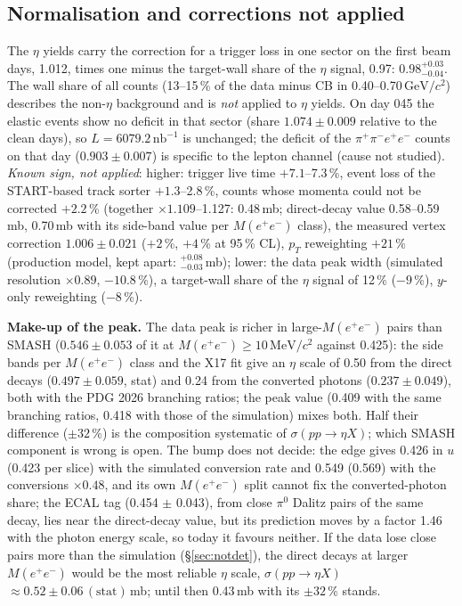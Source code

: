 \documentclass[11pt,a4paper]{article}
\newcommand{\piz}{\ensuremath{\pi^{0}}\xspace}
\newcommand{\ppee}{\ensuremath{\pi^{+}\pi^{-}e^{+}e^{-}}\xspace}
\newcommand{\Mee}{\ensuremath{M(e^{+}e^{-})}\xspace}
\newcommand{\nbinv}{\ensuremath{\mathrm{nb}^{-1}}\xspace}
\newcommand{\GeVcc}{\ensuremath{\mathrm{GeV}/c^{2}}\xspace}
\newcommand{\MeVcc}{\ensuremath{\mathrm{MeV}/c^{2}}\xspace}
\newcommand{\sigeta}{\ensuremath{\sigma(pp\to\eta X)}\xspace}
\begin{document}
\subsection*{Normalisation and corrections not applied}
The $\eta$ yields carry the correction for a trigger loss in one sector on the first beam days, 1.012, times one minus the target-wall share of the
$\eta$ signal, 0.97: $0.98^{+0.03}_{-0.04}$. The wall share of all counts (13--15\,\% of the data minus CB in 0.40--0.70\,\GeVcc) describes the
non-$\eta$ background and is \emph{not} applied to $\eta$ yields. On day 045 the elastic events show no deficit in that sector (share
$1.074\pm0.009$ relative to the clean days), so $L=6079.2\,\nbinv$ is unchanged; the deficit of the \ppee counts on that day ($0.903\pm0.007$) is
specific to the lepton channel (cause not studied). \emph{Known sign, not applied}: higher: trigger live time $+7.1$--7.3\,\%, event loss of the
START-based track sorter $+1.3$--2.8\,\%, counts whose momenta could not be corrected $+2.2$\,\% (together $\times1.109$--1.127: 0.48\,mb;
direct-decay value 0.58--0.59\,mb, 0.70\,mb with its side-band value per \Mee class), the measured vertex correction $1.006\pm0.021$ ($+2$\,\%,
$+4$\,\% at 95\,\% CL), $p_T$ reweighting $+21$\,\% (production model, kept apart: $^{+0.08}_{-0.03}$\,mb); lower: the data peak width (simulated
resolution $\times0.89$, $-10.8$\,\%), a target-wall share of the $\eta$ signal of 12\,\% ($-9$\,\%), $y$-only reweighting ($-8$\,\%).

\textbf{Make-up of the peak.} The data peak is richer in large-\Mee pairs than SMASH ($0.546\pm0.053$ of it at \Mee$\ge10$\,\MeVcc against 0.425): the
side bands per \Mee class and the X17 fit give an $\eta$ scale of 0.50 from the direct decays ($0.497\pm0.059$, stat) and 0.24 from the converted
photons ($0.237\pm0.049$), both with the PDG 2026 branching ratios; the peak value (0.409 with the same branching ratios, 0.418 with those of
the simulation) mixes both. Half their difference ($\pm32$\,\%) is the composition systematic of \sigeta; which SMASH
component is wrong is open. The bump does not decide: the edge gives 0.426 in $u$ (0.423 per slice) with the simulated conversion rate and 0.549
(0.569) with the conversions $\times0.48$, and its own \Mee split cannot fix the converted-photon share; the ECAL tag (0.454 $\pm$ 0.043), from close
\piz Dalitz pairs of the same decay, lies near the direct-decay value, but its prediction moves by a factor 1.46 with the photon energy scale, so today
it favours neither. If the data lose close pairs more than the simulation (\S\ref{sec:notdet}), the direct decays at larger \Mee would be the most
reliable $\eta$ scale, \sigeta $\approx0.52\pm0.06\,(\mathrm{stat})$\,mb; until then 0.43\,mb with its $\pm32$\,\% stands.
\end{document}
